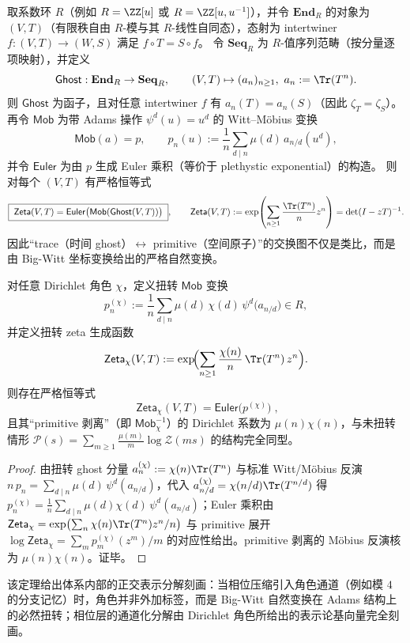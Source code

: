 \begin{proposition}\label{prop:witt-bridge-functorial}
取系数环 \(R\)（例如 \(R=\ZZ[u]\) 或 \(R=\ZZ[u,u^{-1}]\)），并令 \(\mathbf{End}_R\) 的对象为 \((V,T)\)（有限秩自由 \(R\)-模与其 \(R\)-线性自同态），态射为 intertwiner \(f:(V,T)\to (W,S)\) 满足 \(f\circ T=S\circ f\)。
令 \(\mathbf{Seq}_R\) 为 \(R\)-值序列范畴（按分量逐项映射），并定义
\[
\mathsf{Ghost}:\mathbf{End}_R\to \mathbf{Seq}_R,\qquad
(V,T)\mapsto (a_n)_{n\ge 1},\ a_n:=\Tr(T^n).
\]
则 \(\mathsf{Ghost}\) 为函子，且对任意 intertwiner \(f\) 有 \(a_n(T)=a_n(S)\)（因此 \(\zeta_T=\zeta_S\)）。
再令 \(\mathsf{Mob}\) 为带 Adams 操作 \(\psi^d(u)=u^d\) 的 Witt--Möbius 变换
\[
\mathsf{Mob}(a)=p,\qquad
p_n(u):=\frac1n\sum_{d\mid n}\mu(d)\,a_{n/d}(u^d),
\]
并令 \(\mathsf{Euler}\) 为由 \(p\) 生成 Euler 乘积（等价于 plethystic exponential）的构造。
则对每个 \((V,T)\) 有严格恒等式
\[
\boxed{\;
\mathsf{Zeta}(V,T)
=\mathsf{Euler}\bigl(\mathsf{Mob}(\mathsf{Ghost}(V,T))\bigr)\; },
\qquad
\mathsf{Zeta}(V,T):=\exp\!\left(\sum_{n\ge 1}\frac{\Tr(T^n)}{n}z^n\right)=\det(I-zT)^{-1}.
\]
因此“trace（时间 ghost）\(\leftrightarrow\) primitive（空间原子）”的交换图不仅是类比，而是由 Big-Witt 坐标变换给出的严格自然变换。
\end{proposition}

\begin{theorem}\label{thm:witt-dirichlet-twist}
对任意 Dirichlet 角色 \(\chi\)，定义扭转 \(\mathsf{Mob}\) 变换
\[
p_n^{(\chi)}:=\frac{1}{n}\sum_{d\mid n}\mu(d)\,\chi(d)\,\psi^d\!\bigl(a_{n/d}\bigr)\in R,
\]
并定义扭转 zeta 生成函数
\[
\mathsf{Zeta}_{\chi}(V,T)
:=\exp\!\Bigl(\sum_{n\ge 1}\frac{\chi(n)}{n}\,\Tr(T^{n})\,z^{n}\Bigr).
\]
则存在严格恒等式
\[
\boxed{\;\mathsf{Zeta}_{\chi}(V,T)=\mathsf{Euler}\bigl(p^{(\chi)}\bigr)\; },
\]
且其“primitive 剥离”（即 \(\mathsf{Mob}_{\chi}^{-1}\)）的 Dirichlet 系数为 \(\mu(n)\chi(n)\)，与未扭转情形 \(\mathcal{P}(s)=\sum_{m\ge 1}\frac{\mu(m)}{m}\log\mathcal{Z}(ms)\) 的结构完全同型。
\end{theorem}
\begin{proof}
由扭转 ghost 分量 \(a_n^{(\chi)}:=\chi(n)\Tr(T^n)\) 与标准 Witt/Möbius 反演 \(n\,p_n=\sum_{d\mid n}\mu(d)\,\psi^d(a_{n/d})\)，代入 \(a_{n/d}^{(\chi)}=\chi(n/d)\Tr(T^{n/d})\) 得 \(p_n^{(\chi)}=\frac{1}{n}\sum_{d\mid n}\mu(d)\chi(d)\,\psi^d(a_{n/d})\)；Euler 乘积由 \(\mathsf{Zeta}_{\chi}=\exp\bigl(\sum_n \chi(n)\Tr(T^n)z^n/n\bigr)\) 与 primitive 展开 \(\log\mathsf{Zeta}_{\chi}=\sum_m p_m^{(\chi)}(z^m)/m\) 的对应性给出。primitive 剥离的 Möbius 反演核为 \(\mu(n)\chi(n)\)。证毕。
\end{proof}
该定理给出体系内部的正交表示分解刻画：当相位压缩引入角色通道（例如模 \(4\) 的分支记忆）时，角色并非外加标签，而是 Big-Witt 自然变换在 Adams 结构上的必然扭转；相位层的通道化分解由 Dirichlet 角色所给出的表示论基向量完全刻画。

